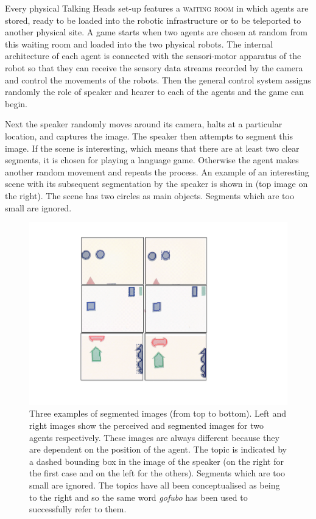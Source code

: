 Every physical Talking Heads set-up features a {\scshape waiting room} in 
which agents are stored, ready to be loaded into the 
robotic infrastructure or to be teleported to another
physical site. A game starts when two agents are chosen
at random from this waiting room and loaded into 
the two physical robots. The
internal architecture of each agent is connected with 
the sensori-motor apparatus of the robot so that they can 
receive the sensory data streams recorded by the camera
and control the movements of the robots. Then the general 
control system assigns randomly the role of speaker and hearer
to each of the agents and the game can begin. 

Next the speaker randomly moves around its camera, halts 
at a particular location, and captures
the image. The speaker then attempts to segment 
this image. If the scene is interesting, which means that
there are at least two clear segments, it is chosen 
for playing a language game. Otherwise the agent makes another 
random movement and repeats the process. An example of 
an interesting scene with its subsequent segmentation
by the speaker is shown in  (top image on the right). The scene
has two circles as main objects. Segments which are too 
small are ignored. 


\begin{figure}[htbp]
  \centerline{\includegraphics[width=.60\textwidth]{chap2/figs/hpos.pdf}}
\caption{Three examples of segmented images (from top to bottom). Left and right images 
show the perceived and segmented images for two agents respectively. These images are always
different because they are dependent on the position of the agent. 
The topic is indicated by a dashed bounding box in the 
image of the speaker (on the right for the first case and on the left for the others). 
Segments which are too small are ignored. The topics have all been conceptualised
as being to the right and so the same word 
\textit{gofubo} has been used to successfully refer to them.}
\label{f:plate10}
\end{figure}

